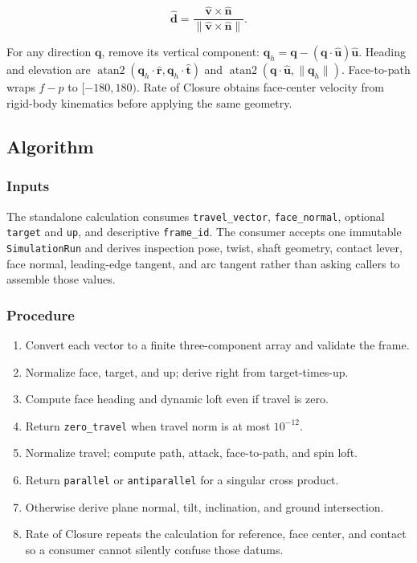 \documentclass[
  american,
]{article}
\providecommand{\tightlist}{%
  \setlength{\itemsep}{0pt}\setlength{\parskip}{0pt}}
\begin{document}
\protect{}\label{dplane-normal-equation}{}

\[
\hat{\mathbf d} =
  \frac{\hat{\mathbf v}\times\hat{\mathbf n}}
       {\lVert\hat{\mathbf v}\times\hat{\mathbf n}\rVert}.
\]

For any direction \(\mathbf q\), remove its vertical component:
\(\mathbf q_h=\mathbf q-(\mathbf q\cdot\hat{\mathbf u})\hat{\mathbf u}\).
Heading and elevation are
\(\operatorname{atan2}(\mathbf q_h\cdot\hat{\mathbf r},
\mathbf q_h\cdot\hat{\mathbf t})\) and
\(\operatorname{atan2}(\mathbf q\cdot\hat{\mathbf u},
\lVert\mathbf q_h\rVert)\). Face-to-path wraps \(f-p\) to
\([-180,180)\). Rate of Closure obtains face-center velocity from
rigid-body kinematics before applying the same geometry.

\subsection{Algorithm}\label{algorithm}

\subsubsection{Inputs}\label{inputs}

The standalone calculation consumes \texttt{travel\_vector},
\texttt{face\_normal}, optional \texttt{target} and \texttt{up}, and
descriptive \texttt{frame\_id}. The consumer accepts one immutable
\texttt{SimulationRun} and derives inspection pose, twist, shaft
geometry, contact lever, face normal, leading-edge tangent, and arc
tangent rather than asking callers to assemble those values.

\subsubsection{Procedure}\label{procedure}

\begin{enumerate}
\def\labelenumi{\arabic{enumi}.}
\tightlist
\item
  Convert each vector to a finite three-component array and validate the
  frame.
\item
  Normalize face, target, and up; derive right from target-times-up.
\item
  Compute face heading and dynamic loft even if travel is zero.
\item
  Return \texttt{zero\_travel} when travel norm is at most \(10^{-12}\).
\item
  Normalize travel; compute path, attack, face-to-path, and spin loft.
\item
  Return \texttt{parallel} or \texttt{antiparallel} for a singular cross
  product.
\item
  Otherwise derive plane normal, tilt, inclination, and ground
  intersection.
\item
  Rate of Closure repeats the calculation for reference, face center,
  and contact so a consumer cannot silently confuse those datums.
\end{enumerate}
\end{document}
